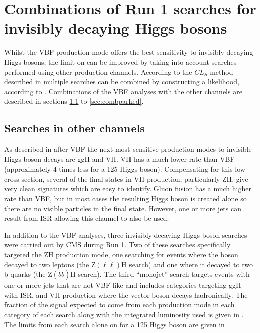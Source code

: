 \chapter{Combinations of Run 1 searches for invisibly decaying Higgs bosons}
\label{chap:comb}
Whilst the \ac{VBF} production mode offers the best sensitivity to invisibly decaying Higgs bosons, the limit on \BRinv can be improved by taking into account searches performed using other production channels. According to the $CL_{S}$ method described in  multiple searches can be combined by constructing a likelihood, according to . Combinations of the \ac{VBF} analyses with the other channels are described in sections \ref{sec:combotherchannels} to \ref{sec:combparked}. 


\section{Searches in other channels}
\label{sec:combotherchannels}
As described in  after \ac{VBF} the next most sensitive production modes to invisible Higgs boson decays are \ac{ggH} and \ac{VH}. \ac{VH} has a much lower rate than \ac{VBF} (approximately 4 times less for a 125 \GeV Higgs boson). Compensating for this low cross-section, several of the final states in \ac{VH} production, particularly \ac{ZH}, give very clean signatures which are easy to identify. Gluon fusion has a much higher rate than \ac{VBF}, but in most cases the resulting Higgs boson is created alone so there are no visible particles in the final state. However, one or more jets can result from \ac{ISR} allowing this channel to also be used. 

In addition to the \ac{VBF} analyses, three invisibly decaying Higgs boson searches were carried out by CMS during Run 1. Two of these searches specifically targeted the \ac{ZH} production mode, one searching for events where the \PZ boson decayed to two leptons (the Z$(\ell\ell)$H search) and one where it decayed to two b quarks (the Z$(b\bar{b})$H search). The third ``monojet'' search targets events with one or more jets that are not \ac{VBF}-like and includes categories targeting \ac{ggH} with \ac{ISR}, and \ac{VH} production where the vector boson decays hadronically. The fraction of the signal expected to come from each production mode in each category of each search along with the integrated luminosity used is given in . The limits from each search alone on \BRinv for a 125 \GeV Higgs boson are given in .

